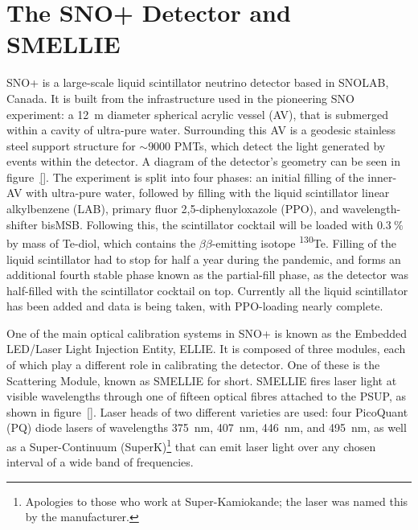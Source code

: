 \section{The SNO+ Detector and SMELLIE}\label{sect:detector}
SNO+ is a large-scale liquid scintillator neutrino detector based in SNOLAB, Canada. It is built from the infrastructure used in the pioneering SNO experiment: a \SI{12}{\metre} diameter spherical acrylic vessel (AV), that is submerged within a cavity of ultra-pure water. Surrounding this AV is a geodesic stainless steel support structure for $\sim\num{9000}$ PMTs, which detect the light generated by events within the detector. A diagram of the detector's geometry can be seen in figure~\ref{}. The experiment is split into four phases: an initial filling of the inner-AV with ultra-pure water, followed by filling with the liquid scintillator linear alkylbenzene (LAB), primary fluor 2,5-diphenyloxazole (PPO), and wavelength-shifter bisMSB. Following this, the scintillator cocktail will be loaded with $\SI{0.3}{\percent}$ by mass of Te-diol, which contains the $\beta\beta$-emitting isotope \textsuperscript{130}Te. Filling of the liquid scintillator had to stop for half a year during the pandemic, and forms an additional fourth stable phase known as the partial-fill phase, as the detector was half-filled with the scintillator cocktail on top. Currently all the liquid scintillator has been added and data is being taken, with PPO-loading nearly complete.

One of the main optical calibration systems in SNO+ is known as the Embedded LED/Laser Light Injection Entity, ELLIE. It is composed of three modules, each of which play a different role in calibrating the detector. One of these is the Scattering Module, known as SMELLIE for short. SMELLIE fires laser light at visible wavelengths through one of fifteen optical fibres attached to the PSUP, as shown in figure~\ref{}. Laser heads of two different varieties are used: four PicoQuant (PQ) diode lasers of wavelengths \SI{375}{\nano\metre}, \SI{407}{\nano\metre}, \SI{446}{\nano\metre}, and \SI{495}{\nano\metre}, as well as a Super-Continuum (SuperK)\footnote{Apologies to those who work at Super-Kamiokande; the laser was named this by the manufacturer.} that can emit laser light over any chosen interval of a wide band of frequencies.